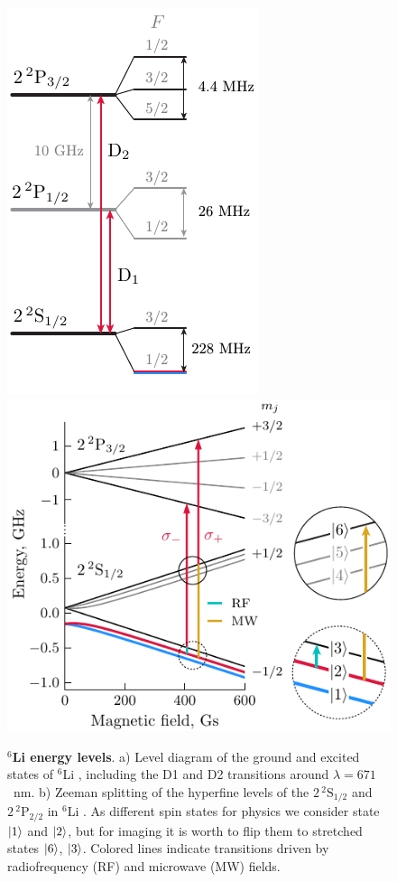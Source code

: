 \begin{figure}[h]
    \centering
    \includegraphics{fig-ai/li-levels-base.pdf}
    \hspace{1cm}
    \includegraphics{fig-ai/li6-zeeman-broken-ai.pdf}
    \caption{
        \textbf{${}^6$Li energy levels}. 
        a) Level diagram of the ground and excited states of ${}^6$Li \cite{gehm_preparation_2003}, including the D1 and D2 transitions around $\lambda = 671$~nm. 
        b) Zeeman splitting of the hyperfine levels of the $2\, {}^2\mathrm{S}_{1/2}$ and $2\, {}^2\mathrm{P}_{2/2}$ in ${}^6$Li \cite{serwane_deterministic_2011, sibalic_arc_2017}. As different spin states for physics we consider state $\left| 1 \right\rangle$ and $\left| 2 \right\rangle$, but for imaging it is worth to flip them to stretched states $\left| 6 \right\rangle$, $\left| 3 \right\rangle$. Colored lines indicate transitions driven by radiofrequency (RF) and microwave (MW) fields.
    }
    \label{fig:li6levels}
\end{figure}


